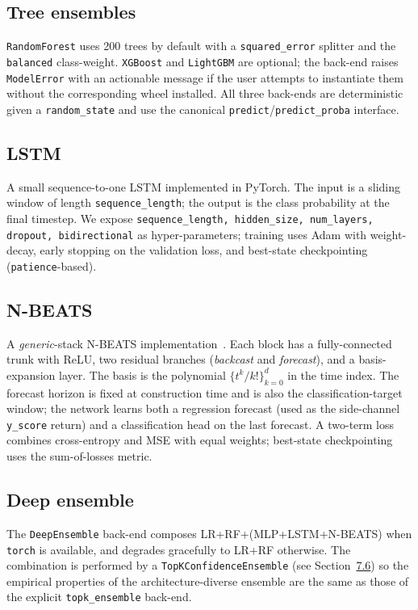 \documentclass[11pt,a4paper]{article}
\begin{document}
\subsection{Tree ensembles}
\texttt{RandomForest} uses 200 trees by default with a
\texttt{squared\_error} splitter and the
\texttt{balanced} class-weight. \texttt{XGBoost} and
\texttt{LightGBM} are optional; the back-end raises
\texttt{ModelError} with an actionable message if the user
attempts to instantiate them without the corresponding wheel
installed. All three back-ends are deterministic given a
\texttt{random\_state} and use the canonical
\texttt{predict}/\texttt{predict\_proba} interface.

\subsection{LSTM}
A small sequence-to-one LSTM implemented in PyTorch. The input
is a sliding window of length \texttt{sequence\_length}; the
output is the class probability at the final timestep. We
expose \texttt{sequence\_length, hidden\_size, num\_layers,
dropout, bidirectional} as hyper-parameters; training uses
Adam with weight-decay, early stopping on the validation
loss, and best-state checkpointing
(\texttt{patience}-based).

\subsection{N-BEATS}
A \emph{generic}-stack N-BEATS
implementation~\cite{oreshkin2020nbeats}. Each block has a
fully-connected trunk with ReLU, two residual branches
(\emph{backcast} and \emph{forecast}), and a basis-expansion
layer. The basis is the polynomial
$\{t^{k}/k!\}_{k=0}^{d}$ in the time index. The forecast
horizon is fixed at construction time and is also the
classification-target window; the network learns both a
regression forecast (used as the side-channel
\texttt{y\_score} return) and a classification head on the
last forecast. A two-term loss combines cross-entropy and
MSE with equal weights; best-state checkpointing uses the
sum-of-losses metric.

\subsection{Deep ensemble}
The \texttt{DeepEnsemble} back-end composes
LR+RF+(MLP+LSTM+N-BEATS) when \texttt{torch} is available,
and degrades gracefully to LR+RF otherwise. The combination
is performed by a \texttt{TopKConfidenceEnsemble} (see
Section~\hyperref[sec:ens]{7.6}) so the empirical properties
of the architecture-diverse ensemble are the same as those
of the explicit \texttt{topk\_ensemble} back-end.
\end{document}
